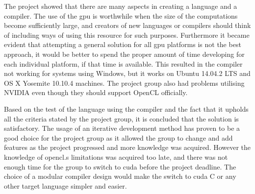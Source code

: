 The project showed that there are many aspects in creating a language and a compiler.
The use of the \acrshort{gpu} is worthwhile when the size of the computations become sufficiently large, and creators of new languages or compilers should think of including ways of using this resource for such purposes.
Furthermore it became evident that attempting a general solution for all \acrshort{gpu} platforms is not the best approach, it would be better to spend the proper amount of time developing for each individual platform, if that time is available.
This resulted in the compiler not working for systems using Windows, but it works on Ubuntu 14.04.2 LTS and OS X Yosemite 10.10.4 machines.
The project group also had problems utilising NVIDIA  even though they should support OpenCL officially.


Based on the test of the language using the compiler and the fact that it upholds all the criteria stated by the project group, it is concluded that the solution is satisfactory.
The usage of an iterative development method has proven to be a good choice for the project group as it allowed the group to change and add features as the project progressed and more knowledge was acquired.
However the knowledge of \gls{opencl}.s limitations was acquired too late, and there was not enough time for the group to switch to \gls{cuda} before the project deadline.
The choice of a modular compiler design would make the switch to \gls{cuda} C or any other target language simpler and easier.
